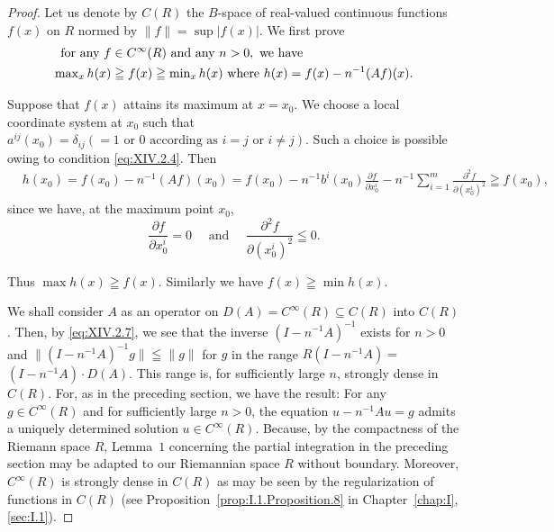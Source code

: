 \begin{proof}
Let us denote by $C(R)$ the $B$-space of real-valued continuous functions $f(x)$ on $R$ normed by $\|f\| = \sup |f(x)|$. We first prove 
\begin{align}
\text{ for any } f& \in C ^{\infty} (R) \text{ and any } n > 0, \text{ we have } \notag \\
\max\limits _{x} h (x)& \geqq f (x) \geqq \min\limits _{x} h (x) \text{ where } h (x) = f (x) - n ^{-1} (A f) (x). \label{eq:XIV.2.7}
\end{align}


Suppose that $f(x)$ attains its maximum at $x = x_0$. We choose a local coordinate system at $x_0$ such that $a^{ij}(x_0) = \delta_{ij} (= 1 \text{ or } 0 \text{ according as } i = j \text{ or } i \neq j)$. Such a choice is possible owing to condition \eqref{eq:XIV.2.4}. Then 
\[
\begin{aligned}
&h (x _{0})  = f (x _{0}) - n ^{-1} (A f) (x _{0}) = f (x _{0}) - n ^{-1} b ^{i} (x _{0}) \frac {\partial f}{\partial x _{0} ^{i}} - n ^{-1} \sum\limits_{i=1} ^{m} \frac {\partial^{2} f}{\partial (x _{0} ^{i}) ^{2}} \geqq f (x _{0}),
\end{aligned}
\]
since we have, at the maximum point $x_0$, 
\[
\frac {\partial f}{\partial x _{0} ^{i}} = 0 \quad \text{ and } \quad \frac {\partial^{2} f}{\partial (x _{0} ^{i}) ^{2}} \leqq 0.
\]

Thus $\max h(x) \geqq f(x)$. Similarly we have $f(x) \geqq \min h(x)$. 

We shall consider $A$ as an operator on $D(A) = C^{\infty}(R) \subseteq C(R)$ into $C(R)$. Then, by \eqref{eq:XIV.2.7}, we see that the inverse $(I - n^{-1}A)^{-1}$ exists for $n > 0$ and $\|(I - n^{-1}A)^{-1}g\| \leqq \|g\|$ for $g$ in the range $R(I - n^{-1}A) =$ $(I - n^{-1}A) \cdot D(A)$. This range is, for sufficiently large $n$, strongly dense in $C(R)$. For, as in the preceding section, we have the result: For any $g \in C^{\infty}(R)$ and for sufficiently large $n > 0$, the equation $u - n^{-1}Au = g$ admits a uniquely determined solution $u \in C^{\infty}(R)$. Because, by the compactness of the Riemann space $R$, Lemma~\hyperref[lem:XIV.1.Lemma.1]{$1$} concerning the partial integration in the preceding section may be adapted to our Riemannian space $R$ without boundary. Moreover, $C^{\infty}(R)$ is strongly dense in $C(R)$ as may be seen by the regularization of functions in $C(R)$ (see Proposition~\ref{prop:I.1.Proposition.8} in Chapter~\ref{chap:I}, \ref{sec:I.1}). 


\end{proof}
